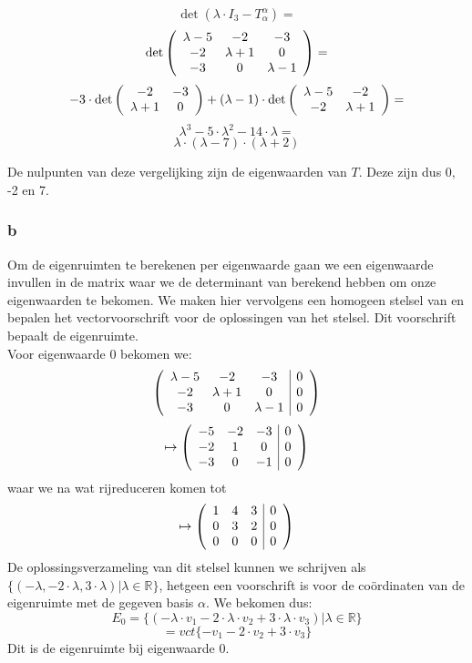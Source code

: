 \documentclass[lineaire_algebra_oplossingen.tex]{subfiles}
\begin{document}
\[\det(\lambda \cdot I_3 - T^\alpha_\alpha)=\]
\[\det\left(
\begin{array}{c c c}
\lambda-5 & -2 & -3 \\
-2 & \lambda+1 & 0 \\
-3 & 0 & \lambda-1 \\
\end{array}
\right)=\]
\[-3 \cdot \det\left(
\begin{array}{c c}
-2 & -3 \\
\lambda+1 & 0 \\
\end{array}
\right) + (\lambda-1) \cdot \det\left(
\begin{array}{c c}
\lambda-5 & -2 \\
-2 & \lambda+1 \\
\end{array}
\right)=\]
\[\lambda^3 - 5\cdot\lambda^2 - 14\cdot\lambda=\]
\[\lambda\cdot(\lambda-7)\cdot(\lambda+2)\]

De nulpunten van deze vergelijking zijn de eigenwaarden van $T$. Deze zijn dus 0, -2 en 7.

\subsubsection*{b}

Om de eigenruimten te berekenen per eigenwaarde gaan we een eigenwaarde invullen in de matrix waar we de determinant van berekend hebben om onze eigenwaarden te bekomen. We maken hier vervolgens een homogeen stelsel van en bepalen het vectorvoorschrift voor de oplossingen van het stelsel. Dit voorschrift bepaalt de eigenruimte.\\

Voor eigenwaarde 0 bekomen we:
\[\left(
\begin{array}{c c c | c}
\lambda-5 & -2 & -3 & 0\\
-2 & \lambda+1 & 0 & 0\\
-3 & 0 & \lambda-1 & 0\\
\end{array}
\right)\]
\[\mapsto\left(
\begin{array}{c c c | c}
-5 & -2 & -3 & 0 \\
-2 & 1 & 0 & 0\\
-3 & 0 & -1 & 0\\
\end{array}
\right)\]
waar we na wat rijreduceren komen tot
\[\mapsto\left(
\begin{array}{c c c | c}
1 & 4 & 3 & 0 \\
0 & 3 & 2 & 0\\
0 & 0 & 0 & 0\\
\end{array}
\right)\]
De oplossingsverzameling van dit stelsel kunnen we schrijven als $\{(-\lambda,-2\cdot\lambda,3\cdot\lambda)|\lambda\in\mathbb{R}\}$, hetgeen een voorschrift is voor de co\"ordinaten van de eigenruimte met de gegeven basis $\alpha$. We bekomen dus:
\[E_0 = \{(-\lambda \cdot v_1-2\cdot\lambda \cdot v_2+3 \cdot \lambda \cdot v_3)|\lambda\in\mathbb{R}\}\]
\[=vct\{-v_1-2 \cdot v_2+3 \cdot v_3\}\]
Dit is de eigenruimte bij eigenwaarde 0.
\end{document}
